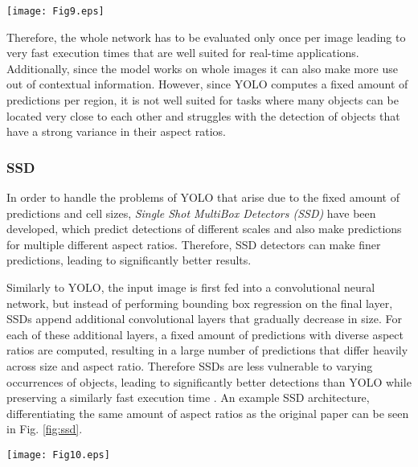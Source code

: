 \documentclass[conference]{IEEEtran}
\begin{document}
\begin{figure*}
\texttt{[image: Fig9.eps]}
\caption{The YOLO detection architecture. The input image is overlayed by a grid consisting of $S \times S$ cells. Afterwards, a DCNN is predicting $B$ bounding boxes and $C$ classes per grid cell. The results are thresholded to obtain the final predictions}
\label{fig:yolo}
\end{figure*}

Therefore, the whole network has to be evaluated only once per image leading to very fast execution times that are well suited for real-time applications. Additionally, since the model works on whole images it can also make more use out of contextual information. However, since YOLO computes a fixed amount of predictions per region, it is not well suited for tasks where many objects can be located very close to each other and struggles with the detection of objects that have a strong variance in their aspect ratios.

\subsubsection{SSD}
In order to handle the problems of YOLO that arise due to the fixed amount of predictions and cell sizes, \emph{Single Shot MultiBox Detectors (SSD)} have been developed, which predict detections of different scales and also make predictions for multiple different aspect ratios. Therefore, SSD detectors can make finer predictions, leading to significantly better results.

Similarly to YOLO, the input image is first fed into a convolutional neural network, but instead of performing bounding box regression on the final layer, SSDs append additional convolutional layers that gradually decrease in size. For each of these additional layers, a fixed amount of predictions with diverse aspect ratios are computed, resulting in a large number of predictions that differ heavily across size and aspect ratio. Therefore SSDs are less vulnerable to varying occurrences of objects, leading to significantly better detections than YOLO while preserving a similarly fast execution time \cite{SSD}. An example SSD architecture, differentiating the same amount of aspect ratios as the original paper \cite{SSD} can be seen in Fig. \ref{fig:ssd}.

\begin{figure*}
\texttt{[image: Fig10.eps]}
\caption{The SSD detection architecture. Multiple convolutional layers (feature maps) of decreasing size are appended to the DCNN. For each feature map, a certain amount of detections per class are made with varying aspect ratios and the results are thresholded}
\label{fig:ssd}
\end{figure*}
\end{document}
